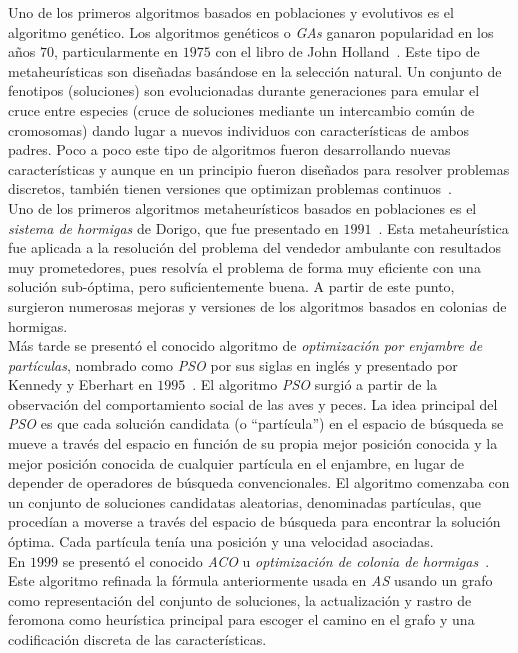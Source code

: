 Uno de los primeros algoritmos basados en poblaciones y evolutivos es el algoritmo genético. Los algoritmos genéticos o \textit{GAs} ganaron popularidad en los años $70$, particularmente en $1975$ con el libro de John Holland~\cite{Holland:1975}. Este tipo de metaheurísticas son diseñadas basándose en la selección natural. Un conjunto de fenotipos (soluciones) son evolucionadas durante generaciones para emular el cruce entre especies (cruce de soluciones mediante un intercambio común de cromosomas) dando lugar a nuevos individuos con características de ambos padres. Poco a poco este tipo de algoritmos fueron desarrollando nuevas características y aunque en un principio fueron diseñados para resolver problemas discretos, también tienen versiones que optimizan problemas continuos~\cite{eiben2015}.\\[6pt]
Uno de los primeros algoritmos metaheurísticos basados en poblaciones es el \textit{sistema de hormigas} de Dorigo, que fue presentado en $1991$~\cite{as}. Esta metaheurística fue aplicada a la resolución del problema del vendedor ambulante con resultados muy prometedores, pues resolvía el problema de forma muy eficiente con una solución sub-óptima, pero suficientemente buena. A partir de este punto, surgieron numerosas mejoras y versiones de los algoritmos basados en colonias de hormigas.\\[6pt]
Más tarde se presentó el conocido algoritmo de \textit{optimización por enjambre de partículas}, nombrado como \textit{PSO} por sus siglas en inglés y presentado por Kennedy y Eberhart en $1995$~\cite{kennedy_particle_1995}. El algoritmo \textit{PSO} surgió a partir de la observación del comportamiento social de las aves y peces. La idea principal del \textit{PSO} es que cada solución candidata (o ``partícula'') en el espacio de búsqueda se mueve a través del espacio en función de su propia mejor posición conocida y la mejor posición conocida de cualquier partícula en el enjambre, en lugar de depender de operadores de búsqueda convencionales. El algoritmo comenzaba con un conjunto de soluciones candidatas aleatorias, denominadas partículas, que procedían a moverse a través del espacio de búsqueda para encontrar la solución óptima. Cada partícula tenía una posición y una velocidad asociadas.\\[6pt]
En $1999$ se presentó el conocido \textit{ACO} u \textit{optimización de colonia de hormigas}~\cite{dorigo_ant_1999}. Este algoritmo refinada la fórmula anteriormente usada en \textit{AS} usando un grafo como representación del conjunto de soluciones, la actualización y rastro de feromona como heurística principal para escoger el camino en el grafo y una codificación discreta de las características.\\[6pt]
